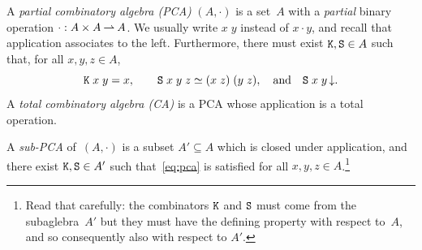 \begin{definition}
  \label{def:pca}%
  A \emph{partial combinatory algebra (PCA)} $(A, {\cdot})$ is a
  set~$A$ with a
  \emph{partial} binary operation ${\cdot} : A \times A \mathbin{\rightharpoonup} A$. We
  usually write $x\; y$ instead of $x \cdot y$, and recall that
  application associates to the left. Furthermore, there must exist
  $\mathtt{K}, \mathtt{S} \in A$ such that, for all $x, y, z \in A$,
  \begin{equation}
    \label{eq:pca}%
    \combK\; x\; y = x,
    \qquad
    \combS\; x\; y\; z \simeq (x\; z)\;(y\; z),
    \quad\text{and}\quad
    \defined{\combS\; x\; y}.
  \end{equation}
  A \emph{total combinatory algebra (CA)} is a PCA whose application
  is a total operation.

  A \emph{sub-PCA} of~$(A, {\cdot})$ is a subset $A' \subseteq A$
  which is closed under application, and there exist $\mathtt{K}, \mathtt{S}
  \in A'$ such that~\eqref{eq:pca} is satisfied for all $x, y, z \in
  A$.\footnote{Read that carefully: the combinators $\mathtt{K}$ and
    $\mathtt{S}$ must come from the subaglebra~$A'$ but they must have the
    defining property with respect to~$A$, and so consequently also
    with respect to $A'$.}
\end{definition}

